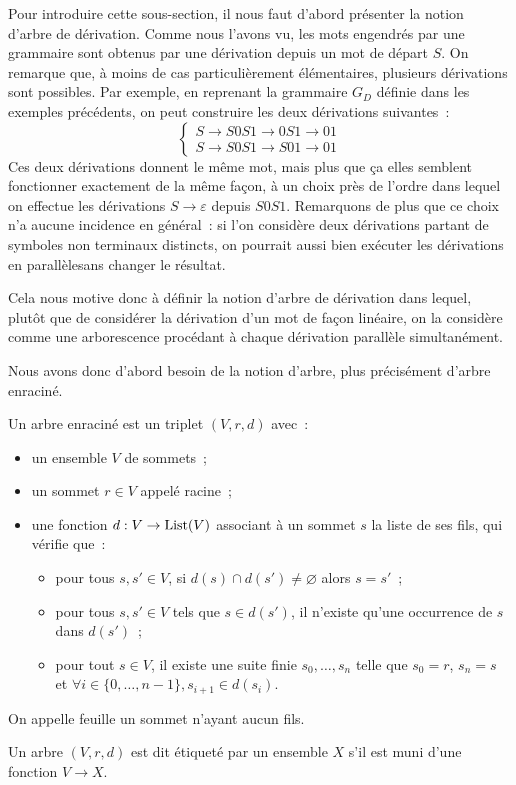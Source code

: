 Pour introduire cette sous-section, il nous faut d'abord présenter la notion
d'arbre de dérivation. Comme nous l'avons vu, les mots engendrés par une
grammaire sont obtenus par une dérivation depuis un mot de départ $S$. On
remarque que, à moins de cas particulièrement élémentaires, plusieurs
dérivations sont possibles. Par exemple, en reprenant la grammaire $G_D$
définie dans les exemples précédents, on peut construire les deux dérivations
suivantes~:
\[\begin{cases}
S \to S0S1 \to 0S1 \to 01\\
S \to S0S1 \to S01 \to 01
\end{cases}\]
Ces deux dérivations donnent le même mot, mais plus que ça elles semblent
fonctionner exactement de la même façon, à un choix près de l'ordre dans
lequel on effectue les dérivations $S \to \varepsilon$ depuis $S0S1$. Remarquons
de plus que ce choix n'a aucune incidence en général~: si l'on considère deux
dérivations partant de symboles non terminaux distincts, on pourrait aussi bien
exécuter les dérivations \og en parallèle\fg sans changer le résultat.

Cela nous motive donc à définir la notion d'arbre de dérivation dans lequel,
plutôt que de considérer la dérivation d'un mot de façon linéaire, on la
considère comme une arborescence procédant à chaque dérivation parallèle
simultanément.

Nous avons donc d'abord besoin de la notion d'arbre, plus précisément
d'arbre enraciné.

\begin{definition}
  Un arbre enraciné est un triplet $(V,r,d)$ avec~:
  \begin{itemize}
  \item un ensemble $V$ de sommets~;
  \item un sommet $r \in V$ appelé racine~;
  \item une fonction $d : V \to \operatorname{List}(V)$ associant à un sommet $s$
    la liste de ses fils, qui vérifie que~:
    \begin{itemize}
    \item pour tous $s,s'\in V$, si $d(s) \cap d(s')\neq\varnothing$ alors
      $s = s'$~;
    \item pour tous $s,s' \in V$ tels que $s \in d(s')$, il n'existe qu'une
      occurrence de $s$ dans $d(s')$~;
    \item pour tout $s \in V$, il existe une suite finie $s_0,\ldots,s_n$ telle
      que $s_0 = r$, $s_n = s$ et
      $\forall i \in \{0,\ldots,n-1\},s_{i+1} \in d(s_i)$.
    \end{itemize}
  \end{itemize}

  On appelle feuille un sommet n'ayant aucun fils.

  Un arbre $(V,r,d)$ est dit étiqueté par un ensemble $X$ s'il est muni d'une
  fonction $V \to X$.
\end{definition}

